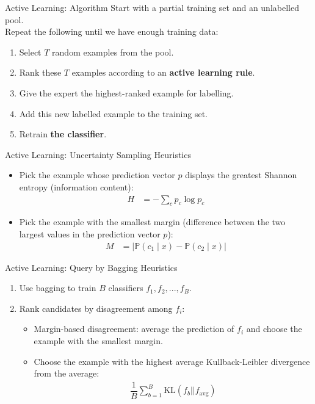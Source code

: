\documentclass{beamer}
\begin{document}
\begin{frame}{Active Learning: Algorithm}
	Start with a partial training set and an unlabelled pool.\\
	Repeat the following until we have enough training data:
	\begin{enumerate}
		\item Select $T$ random examples from the pool.
		\item Rank these $T$ examples according to an \textbf{active learning rule}.
		\item Give the expert the highest-ranked example for labelling.
		\item Add this new labelled example to the training set.
		\item Retrain \textbf{the classifier}.
	\end{enumerate}
\end{frame}

\begin{frame}{Active Learning: Uncertainty Sampling Heuristics}
	\begin{itemize}
		\item Pick the example whose prediction vector $p$ displays the greatest Shannon entropy
		(information content):
			\begin{align*}
			H &= - \sum_c p_c \log p_c
			\end{align*}
		\item Pick the example with the smallest margin (difference between
		the two largest values in the prediction vector $p$):
			\begin{align*}
			M &= \left\vert \mathbb{P}(c_1 \mid x) - \mathbb{P}(c_2 \mid x) \right\vert
			\end{align*}
	\end{itemize}
\end{frame}


\begin{frame}{Active Learning: Query by Bagging Heuristics}
	\begin{enumerate}
		\item Use bagging to train $B$ classifiers $f_1, f_2, ..., f_B$.
		\item Rank candidates by disagreement among $f_i$:
		\begin{itemize}
			\item Margin-based disagreement: average the prediction of $f_i$ and choose the
			example with the smallest margin.
			\item Choose the example with the highest average Kullback-Leibler divergence
			from the average:
			\begin{align*}
			\dfrac{1}{B} \sum_{b=1}^{B} \text{KL} (f_b || f_\text{avg})
			\end{align*}
		\end{itemize}	
	\end{enumerate}
\end{frame}
\end{document}
